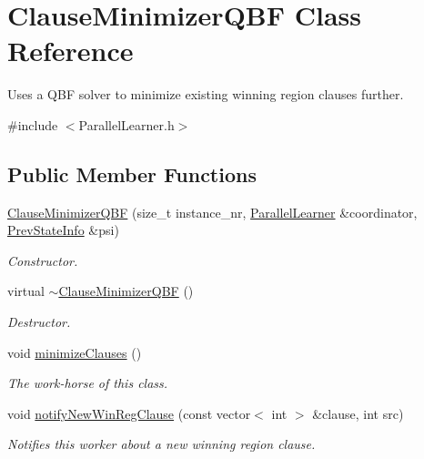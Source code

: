 \hypertarget{classClauseMinimizerQBF}{\section{Clause\-Minimizer\-Q\-B\-F Class Reference}
\label{classClauseMinimizerQBF}
}


Uses a Q\-B\-F solver to minimize existing winning region clauses further.  




{\ttfamily \#include $<$Parallel\-Learner.\-h$>$}

\subsection*{Public Member Functions}
\begin{DoxyCompactItemize}
\item 
\hyperlink{classClauseMinimizerQBF_ac64ce9b8fa79e723b6c537ad81c06a61}{Clause\-Minimizer\-Q\-B\-F} (size\-\_\-t instance\-\_\-nr, \hyperlink{classParallelLearner}{Parallel\-Learner} \&coordinator, \hyperlink{classPrevStateInfo}{Prev\-State\-Info} \&psi)
\begin{DoxyCompactList}\small\item\em Constructor. \end{DoxyCompactList}\item 
virtual \hyperlink{classClauseMinimizerQBF_af3d84d76f410d1c0184e29990262d4d3}{$\sim$\-Clause\-Minimizer\-Q\-B\-F} ()
\begin{DoxyCompactList}\small\item\em Destructor. \end{DoxyCompactList}\item 
void \hyperlink{classClauseMinimizerQBF_a5f6aca824bfe92db2355483d40db140f}{minimize\-Clauses} ()
\begin{DoxyCompactList}\small\item\em The work-\/horse of this class. \end{DoxyCompactList}\item 
void \hyperlink{classClauseMinimizerQBF_a99f5d840ff111a19ef2eca20b9017106}{notify\-New\-Win\-Reg\-Clause} (const vector$<$ int $>$ \&clause, int src)
\begin{DoxyCompactList}\small\item\em Notifies this worker about a new winning region clause. \end{DoxyCompactList}\end{DoxyCompactItemize}
